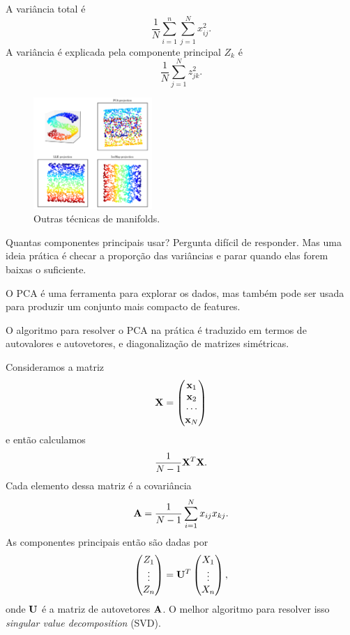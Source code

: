 \documentclass[a4paper,fleqn,12pt]{article}
\begin{document}
A variância total é
$$
\frac{1}{N} \sum_{i=1}^{n} \sum_{j=1}^{N} x_{ij}^2.
$$
A variância é explicada pela componente principal $Z_k$ é
$$
\frac{1}{N} \sum_{j=1}^{N} z_{jk}^2.
$$

\begin{figure}[H]
\centering
\includegraphics[width=0.4\textwidth]{fig/manifold_techniques.png}
\caption{Outras técnicas de manifolds.}
\label{fig:manifold_techniques}
\end{figure}

Quantas componentes principais usar? Pergunta difícil de responder. Mas uma ideia prática é checar a proporção das variâncias e parar quando elas forem baixas o suficiente.

O PCA é uma ferramenta para explorar os dados, mas também pode ser usada para produzir um conjunto mais compacto de features.

O algoritmo para resolver o PCA na prática é traduzido em termos de autovalores e autovetores, e diagonalização de matrizes simétricas.

Consideramos a matriz
$$
\vb{X} =
\begin{pmatrix}
\vb{x}_1 \\
\vb{x}_2 \\
\cdots \\
\vb{x}_N \\
\end{pmatrix}
$$
e então calculamos
$$
\frac{1}{N-1} \vb{X}^T \vb{X}.
$$
Cada elemento dessa matriz é a covariância
$$
\vb{A} = \frac{1}{N-1} \sum_{i=1}^{N} x_{ij} x_{kj}.
$$
As componentes principais então são dadas por
$$
\begin{pmatrix}
Z_1 \\
\vdots \\
Z_n \\
\end{pmatrix} =
\vb{U}^T
\begin{pmatrix}
X_1 \\
\vdots \\
X_n \\
\end{pmatrix},
$$
onde $\vb{U}$ é a matriz de autovetores $\vb{A}$. O melhor algoritmo para resolver isso \textit{singular value decomposition} (SVD).
\end{document}
